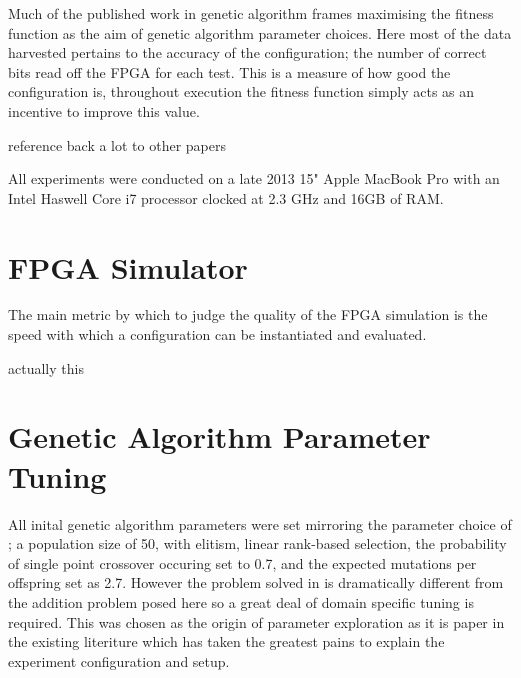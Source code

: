 Much of the published work in genetic algorithm frames maximising the fitness function
as the aim of genetic algorithm parameter choices. Here most of the data harvested
pertains to the accuracy of the configuration; the number of correct bits read off
the FPGA for each test. This is a measure of how good the configuration is, throughout
execution the fitness function simply acts as an incentive to improve this value.

\todo reference back a lot to other papers

All experiments were conducted on a late 2013 15" Apple MacBook Pro with an
Intel Haswell Core i7 processor clocked at 2.3 GHz and 16GB of RAM.

\section{FPGA Simulator}
The main metric by which to judge the quality of the FPGA simulation is the
speed with which a configuration can be instantiated and evaluated.

\todo actually this

\section{Genetic Algorithm Parameter Tuning \label{s:ga_tune}}
All inital genetic algorithm parameters were set mirroring the parameter choice
of \cite{10.1007/3-540-63173-9_61};
a population size of 50, with elitism, linear rank-based selection, the probability
of single point crossover occuring set to 0.7, and the expected mutations per
offspring set as 2.7. However the problem solved in \cite{10.1007/3-540-63173-9_61}
is dramatically different from the addition problem posed here so a great deal
of domain specific tuning is required. This was chosen as the origin of parameter
exploration as it is paper in the existing literiture which has taken the greatest
pains to explain the experiment configuration and setup.

